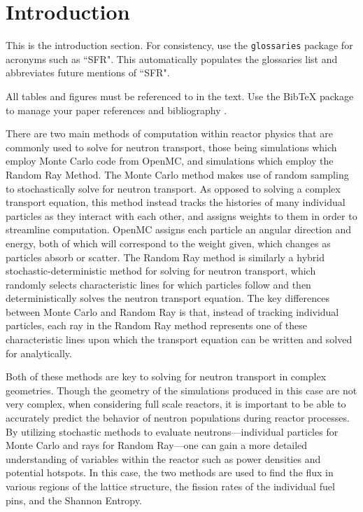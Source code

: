 \section{Introduction}
\label{sec:intro}
This is the introduction section. For consistency, use the
\texttt{glossaries} package for acronyms such as ``\gls{SFR}".
This automatically populates the glossaries list and abbreviates future
mentions of ``\gls{SFR}".

All tables and figures must be referenced to in the text.
Use the BibTeX package to manage your paper references and bibliography
\cite{huff_extensions_2014}.

There are two main methods of computation within reactor physics that are commonly used to solve for neutron transport, those being simulations which employ Monte Carlo code from OpenMC, and simulations which employ the Random Ray Method. The Monte Carlo method makes use of random sampling to stochastically solve for neutron transport. As opposed to solving a complex transport equation, this method instead tracks the histories of many individual particles as they interact with each other, and assigns weights to them in order to streamline computation. OpenMC assigns each particle an angular direction and energy, both of which will correspond to the weight given, which changes as particles absorb or scatter. The Random Ray method is similarly a hybrid stochastic-deterministic  method for solving for neutron transport, which randomly selects characteristic lines for which particles follow and then deterministically solves the neutron transport equation. The key differences between Monte Carlo and Random Ray is that, instead of tracking individual particles, each ray in the Random Ray method represents one of these characteristic lines upon which the transport equation can be written and solved for analytically.

Both of these methods are key to solving for neutron transport in complex geometries. Though the geometry of the simulations produced in this case are not very complex, when considering full scale reactors, it is important to be able to accurately predict the behavior of neutron populations during reactor processes. By utilizing stochastic methods to evaluate neutrons---individual particles for Monte Carlo and rays for Random Ray---one can gain a more detailed understanding of variables within the reactor such as power densities and potential hotspots. In this case, the two methods are used to find the flux in various regions of the lattice structure, the fission rates of the individual fuel pins, and the Shannon Entropy.
